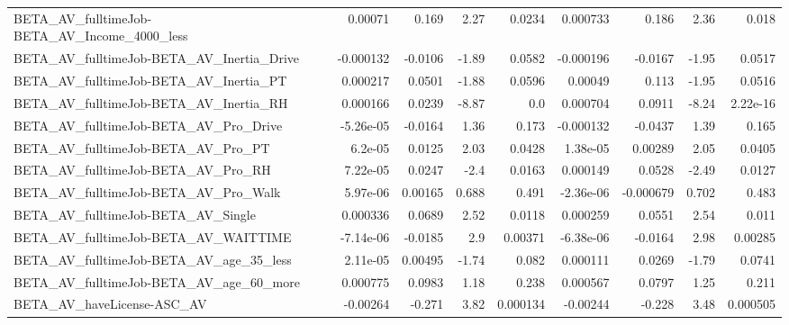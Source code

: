 \begin{tabular}{lrrrrrrrr}
BETA\_AV\_fulltimeJob-BETA\_AV\_Income\_4000\_less       &     0.00071 &        0.169 &     2.27 &   0.0234 &   0.000733 &       0.186 &         2.36 &         0.018 \\
BETA\_AV\_fulltimeJob-BETA\_AV\_Inertia\_Drive          &   -0.000132 &      -0.0106 &    -1.89 &   0.0582 &  -0.000196 &     -0.0167 &        -1.95 &        0.0517 \\
BETA\_AV\_fulltimeJob-BETA\_AV\_Inertia\_PT             &    0.000217 &       0.0501 &    -1.88 &   0.0596 &    0.00049 &       0.113 &        -1.95 &        0.0516 \\
BETA\_AV\_fulltimeJob-BETA\_AV\_Inertia\_RH             &    0.000166 &       0.0239 &    -8.87 &      0.0 &   0.000704 &      0.0911 &        -8.24 &      2.22e-16 \\
BETA\_AV\_fulltimeJob-BETA\_AV\_Pro\_Drive              &   -5.26e-05 &      -0.0164 &     1.36 &    0.173 &  -0.000132 &     -0.0437 &         1.39 &         0.165 \\
BETA\_AV\_fulltimeJob-BETA\_AV\_Pro\_PT                 &     6.2e-05 &       0.0125 &     2.03 &   0.0428 &   1.38e-05 &     0.00289 &         2.05 &        0.0405 \\
BETA\_AV\_fulltimeJob-BETA\_AV\_Pro\_RH                 &    7.22e-05 &       0.0247 &     -2.4 &   0.0163 &   0.000149 &      0.0528 &        -2.49 &        0.0127 \\
BETA\_AV\_fulltimeJob-BETA\_AV\_Pro\_Walk               &    5.97e-06 &      0.00165 &    0.688 &    0.491 &  -2.36e-06 &   -0.000679 &        0.702 &         0.483 \\
BETA\_AV\_fulltimeJob-BETA\_AV\_Single                 &    0.000336 &       0.0689 &     2.52 &   0.0118 &   0.000259 &      0.0551 &         2.54 &         0.011 \\
BETA\_AV\_fulltimeJob-BETA\_AV\_WAITTIME               &   -7.14e-06 &      -0.0185 &      2.9 &  0.00371 &  -6.38e-06 &     -0.0164 &         2.98 &       0.00285 \\
BETA\_AV\_fulltimeJob-BETA\_AV\_age\_35\_less            &    2.11e-05 &      0.00495 &    -1.74 &    0.082 &   0.000111 &      0.0269 &        -1.79 &        0.0741 \\
BETA\_AV\_fulltimeJob-BETA\_AV\_age\_60\_more            &    0.000775 &       0.0983 &     1.18 &    0.238 &   0.000567 &      0.0797 &         1.25 &         0.211 \\
BETA\_AV\_haveLicense-ASC\_AV                         &    -0.00264 &       -0.271 &     3.82 & 0.000134 &   -0.00244 &      -0.228 &         3.48 &      0.000505 \\

\end{tabular}
